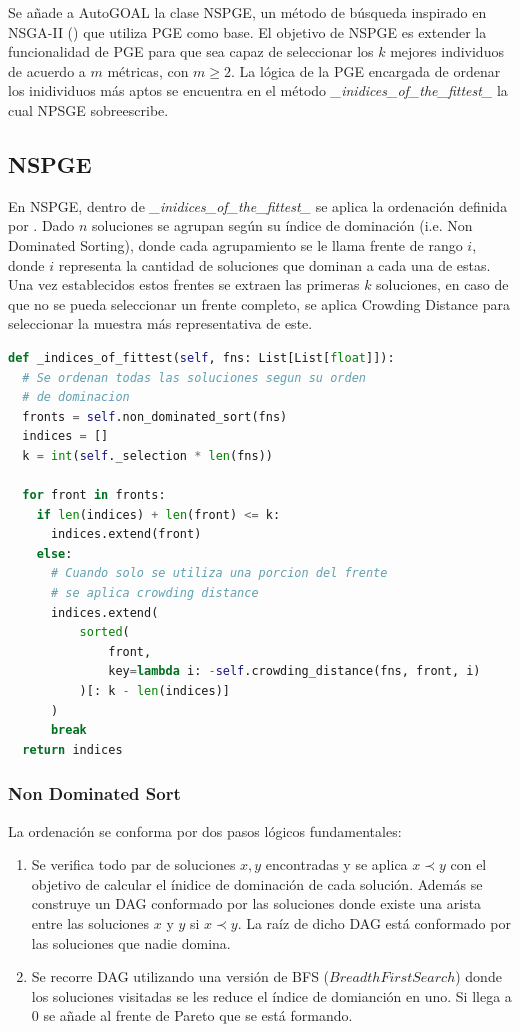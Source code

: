 Se a\~nade a AutoGOAL la clase NSPGE, un m\'etodo de b\'usqueda inspirado en NSGA-II (\cite{deb2002fast}) que utiliza PGE como base. El objetivo de NSPGE es extender la funcionalidad de PGE para que sea capaz de seleccionar los $k$ mejores individuos de acuerdo a $m$ m\'etricas, con $m \ge 2$. La l\'ogica de la PGE encargada de ordenar los inidividuos m\'as aptos se encuentra en el m\'etodo \textit{\_inidices\_of\_the\_fittest\_} la cual NPSGE sobreescribe.

\subsection{NSPGE}

En NSPGE, dentro de \textit{\_inidices\_of\_the\_fittest\_} se aplica la ordenaci\'on definida por \cite{deb2002fast}. Dado $n$ soluciones se  agrupan seg\'un su \'indice de dominaci\'on (i.e. Non Dominated Sorting), donde cada agrupamiento se le llama frente de rango $i$, donde $i$ representa la cantidad de soluciones que dominan a cada una de estas. Una vez establecidos estos frentes se extraen las primeras $k$ soluciones, en caso de que no se pueda seleccionar un frente completo, se aplica Crowding Distance para seleccionar la muestra m\'as representativa de este.


\begin{lstlisting}[caption=Nueva ordenaci\'on, language=Python]
def _indices_of_fittest(self, fns: List[List[float]]):
  # Se ordenan todas las soluciones segun su orden
  # de dominacion
  fronts = self.non_dominated_sort(fns)
  indices = []
  k = int(self._selection * len(fns))

  for front in fronts:
    if len(indices) + len(front) <= k:
      indices.extend(front)
    else:
      # Cuando solo se utiliza una porcion del frente
      # se aplica crowding distance
      indices.extend(
          sorted(
              front,
              key=lambda i: -self.crowding_distance(fns, front, i)
          )[: k - len(indices)]
      )
      break
  return indices
\end{lstlisting}

\subsubsection{Non Dominated Sort}
La ordenaci\'on se conforma por dos pasos l\'ogicos fundamentales:
\begin{enumerate}
    \item Se verifica todo par de soluciones $x, y$ encontradas y se aplica $x \prec y$ con el objetivo de calcular el \'inidice de dominaci\'on de cada soluci\'on. Adem\'as se construye un DAG conformado por las soluciones donde existe una arista entre las soluciones $x$ y $y$ si $x \prec y$. La ra\'iz de dicho DAG est\'a conformado por las soluciones que nadie domina.
    \item Se recorre DAG utilizando una versi\'on de BFS ($Breadth First Search$) donde los soluciones visitadas se les reduce el \'indice de domianci\'on en uno. Si llega a 0 se a\~nade al frente de Pareto que se est\'a formando.
\end{enumerate}

